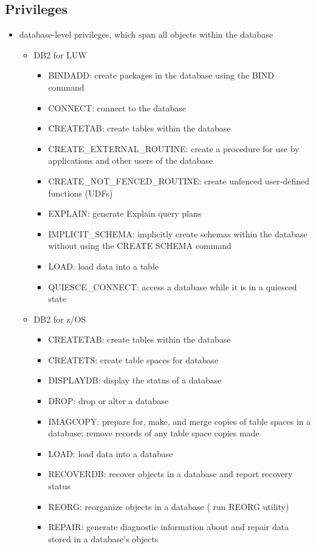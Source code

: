 \documentclass{article}
\begin{document}
\subsection{Privileges}
\begin{itemize}
\item database-level privileges, which span all objects within the database
\begin{itemize}
\item DB2 for LUW
\begin{itemize}
\item BINDADD: create packages in the database using the BIND command
\item CONNECT: connect to the database
\item CREATETAB: create tables within the database
\item CREATE\_EXTERNAL\_ROUTINE: create a procedure for use by applications and other users of the 
database
\item CREATE\_NOT\_FENCED\_ROUTINE: create unfenced user-defined functions (UDFs)
\item EXPLAIN: generate Explain query plans
\item IMPLICIT\_SCHEMA: implicitly create schemas within the database without using the
CREATE SCHEMA command
\item LOAD: load data into a table
\item QUIESCE\_CONNECT: access a database while it is in a quiesced state
\end{itemize}
\item DB2 for z/OS
\begin{itemize}
\item CREATETAB: create tables within the database
\item CREATETS: create table spaces for database
\item DISPLAYDB: display the status of a database
\item DROP: drop or alter a database
\item IMAGCOPY: prepare for, make, and merge copies of table spaces in a database; 
remove records of any table space copies made
\item LOAD: load data into a database
\item RECOVERDB: recover objects in a database and report recovery status
\item REORG: reorganize objects in a database ( run REORG utility)
\item REPAIR: generate diagnostic information about and repair data stored in a database's objects

\end{itemize}
\end{itemize}
\end{itemize}
\end{document}
